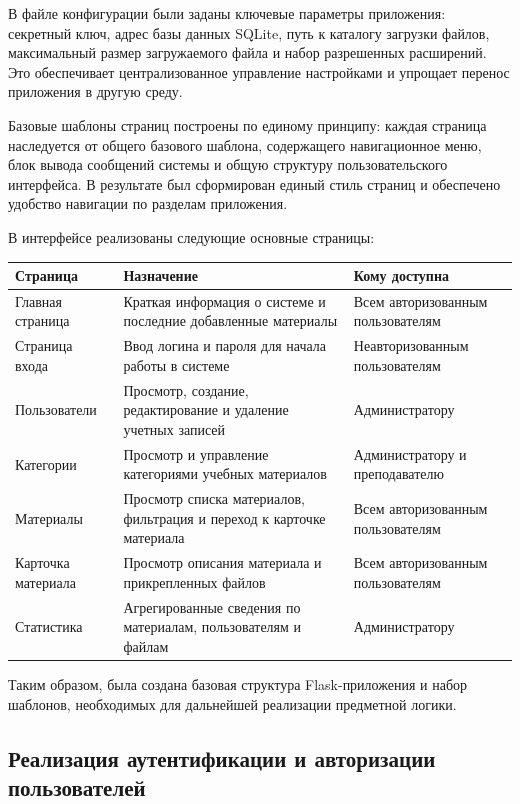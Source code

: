 В файле конфигурации были заданы ключевые параметры приложения: секретный ключ, адрес базы данных SQLite, путь к каталогу загрузки файлов, максимальный размер загружаемого файла и набор разрешенных расширений. Это обеспечивает централизованное управление настройками и упрощает перенос приложения в другую среду.

Базовые шаблоны страниц построены по единому принципу: каждая страница наследуется от общего базового шаблона, содержащего навигационное меню, блок вывода сообщений системы и общую структуру пользовательского интерфейса. В результате был сформирован единый стиль страниц и обеспечено удобство навигации по разделам приложения.

В интерфейсе реализованы следующие основные страницы:

\begin{center}
\small\begin{tabularx}{0.96\textwidth}{>{\raggedright\arraybackslash}p{3.8cm} >{\raggedright\arraybackslash}X >{\raggedright\arraybackslash}p{4.3cm}}
\toprule
\textbf{Страница} & \textbf{Назначение} & \textbf{Кому доступна} \\
\midrule
Главная страница & Краткая информация о системе и последние добавленные материалы & Всем авторизованным пользователям \\
Страница входа & Ввод логина и пароля для начала работы в системе & Неавторизованным пользователям \\
Пользователи & Просмотр, создание, редактирование и удаление учетных записей & Администратору \\
Категории & Просмотр и управление категориями учебных материалов & Администратору и преподавателю \\
Материалы & Просмотр списка материалов, фильтрация и переход к карточке материала & Всем авторизованным пользователям \\
Карточка материала & Просмотр описания материала и прикрепленных файлов & Всем авторизованным пользователям \\
Статистика & Агрегированные сведения по материалам, пользователям и файлам & Администратору \\
\bottomrule
\end{tabularx}
\end{center}

Таким образом, была создана базовая структура Flask-приложения и набор шаблонов, необходимых для дальнейшей реализации предметной логики.

\subsection{Реализация аутентификации и авторизации пользователей}

